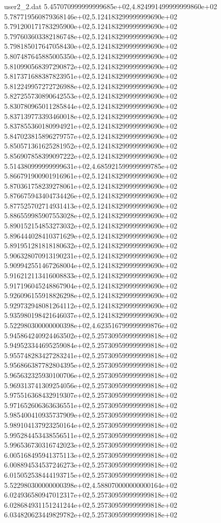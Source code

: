 \begin{filecontents}{user2_2.dat}
5.457070999999999685e+02,4.824991499999999860e+02
5.787719560879368146e+02,5.124183299999999690e+02
5.791200171783295900e+02,5.124183299999999690e+02
5.797603603382186748e+02,5.124183299999999690e+02
5.798185017647058430e+02,5.124183299999999690e+02
5.807487645885005350e+02,5.124183299999999690e+02
5.810990568397290872e+02,5.124183299999999690e+02
5.817371688387823951e+02,5.124183299999999690e+02
5.812249957272726988e+02,5.124183299999999690e+02
5.827255730890642553e+02,5.124183299999999690e+02
5.830780965011285844e+02,5.124183299999999690e+02
5.837139773393460018e+02,5.124183299999999690e+02
5.837855360180994921e+02,5.124183299999999690e+02
5.847023815896279757e+02,5.124183299999999690e+02
5.850571361625281952e+02,5.124183299999999690e+02
5.856907858399097222e+02,5.124183299999999690e+02
5.514380999999999631e+02,4.685921599999999785e+02
5.866791900901916961e+02,5.124183299999999690e+02
5.870361758239278061e+02,5.124183299999999690e+02
5.876675943404734426e+02,5.124183299999999690e+02
5.877525702714931413e+02,5.124183299999999690e+02
5.886559985907553028e+02,5.124183299999999690e+02
5.890152154853273032e+02,5.124183299999999690e+02
5.896444028410371629e+02,5.124183299999999690e+02
5.891951281818180632e+02,5.124183299999999690e+02
5.906328070913190231e+02,5.124183299999999690e+02
5.909942551467268004e+02,5.124183299999999690e+02
5.916212113416008833e+02,5.124183299999999690e+02
5.917196045248867904e+02,5.124183299999999690e+02
5.926096155918826298e+02,5.124183299999999690e+02
5.929732948081264112e+02,5.124183299999999690e+02
5.935980198421646037e+02,5.124183299999999690e+02
5.522980300000000398e+02,4.623516799999999876e+02
5.945864240924463502e+02,5.257309599999999818e+02
5.949523344695259084e+02,5.257309599999999818e+02
5.955748283427283241e+02,5.257309599999999818e+02
5.956866387782804395e+02,5.257309599999999818e+02
5.965632325930100706e+02,5.257309599999999818e+02
5.969313741309254056e+02,5.257309599999999818e+02
5.975516368432919307e+02,5.257309599999999818e+02
5.971652606363636551e+02,5.257309599999999818e+02
5.985400410935737909e+02,5.257309599999999818e+02
5.989104137923250164e+02,5.257309599999999818e+02
5.995284453438556511e+02,5.257309599999999818e+02
5.996536730316742023e+02,5.257309599999999818e+02
6.005168495941375113e+02,5.257309599999999818e+02
6.008894534537246273e+02,5.257309599999999818e+02
6.015052538444193715e+02,5.257309599999999818e+02
5.522980300000000398e+02,4.588070000000000164e+02
6.024936580947012317e+02,5.257309599999999818e+02
6.028684931151241244e+02,5.257309599999999818e+02
6.034820623449829782e+02,5.257309599999999818e+02

\end{filecontents}
